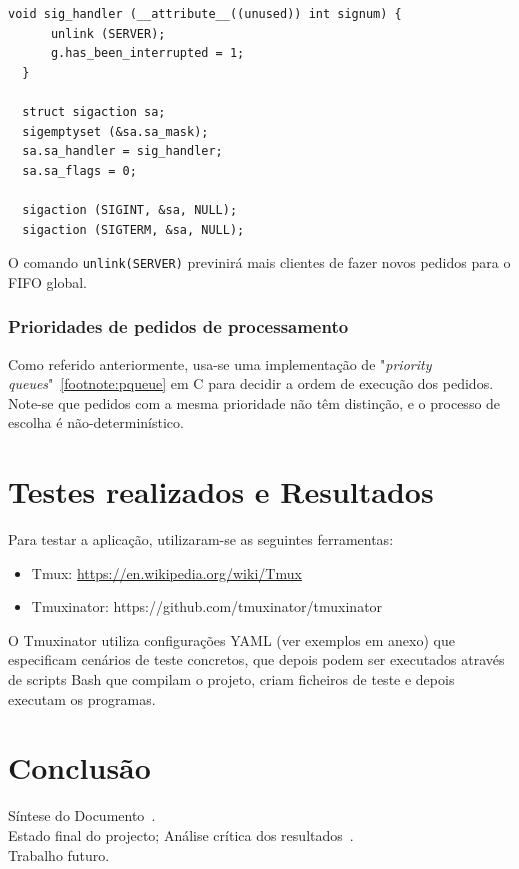\documentclass[11pt,a4paper]{report}%
\begin{document}
\label{code:server_signal}
\begin{lstlisting}[caption={Tratamento de sinais no servidor}]
  void sig_handler (__attribute__((unused)) int signum) {
      unlink (SERVER);
      g.has_been_interrupted = 1;
  }

  struct sigaction sa;
  sigemptyset (&sa.sa_mask);
  sa.sa_handler = sig_handler;
  sa.sa_flags = 0;

  sigaction (SIGINT, &sa, NULL);
  sigaction (SIGTERM, &sa, NULL);
\end{lstlisting}

O comando \lstinline{unlink(SERVER)} previnirá mais clientes de fazer novos pedidos para o FIFO global.

\subsection{Prioridades de pedidos de processamento}

Como referido anteriormente, usa-se uma implementação de "\textit{priority queues}"~\ref{footnote:pqueue} em C
para decidir a ordem de execução dos pedidos.\\

Note-se que pedidos com a mesma prioridade não têm distinção, e o processo de escolha é não-determinístico.

\chapter{Testes realizados e Resultados} \label{chap:bash_testes} %

Para testar a aplicação, utilizaram-se as seguintes ferramentas:

\begin{itemize}
  \item Tmux: \url{https://en.wikipedia.org/wiki/Tmux}
  \item Tmuxinator: https://github.com/tmuxinator/tmuxinator
\end{itemize}

O Tmuxinator utiliza configurações YAML (ver exemplos em anexo) que especificam cenários
de teste concretos, que depois podem ser executados através de scripts Bash que compilam
o projeto, criam ficheiros de teste e depois executam os programas.

\chapter{Conclusão} \label{concl}
Síntese do Documento~\cite{araujo:2018,martini:2018}.\\
Estado final do projecto; Análise crítica dos resultados~\cite{Sto77a}.\\
Trabalho futuro.
\end{document}
